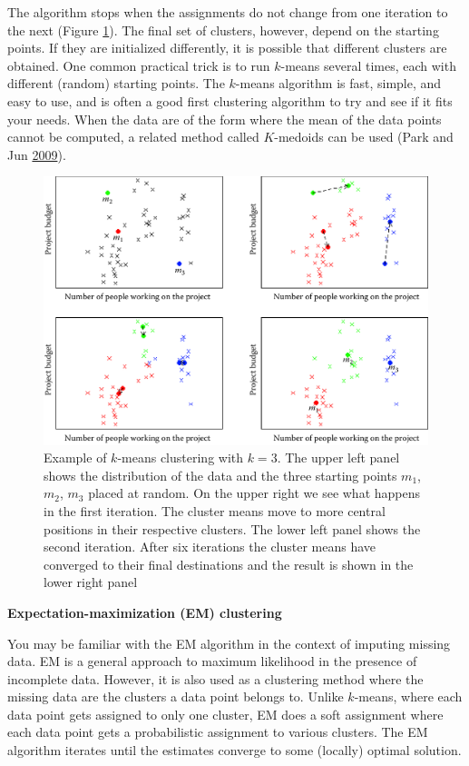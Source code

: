 \documentclass[]{krantz}
\begin{document}
The algorithm stops when the assignments do not change from one
iteration to the next (Figure \ref{fig:kmeans}). The final set of
clusters, however, depend on the starting points. If they are
initialized differently, it is possible that different clusters are
obtained. One common practical trick is to run \(k\)-means several
times, each with different (random) starting points. The \(k\)-means
algorithm is fast, simple, and easy to use, and is often a good first
clustering algorithm to try and see if it fits your needs. When the data
are of the form where the mean of the data points cannot be computed, a
related method called \(K\)-medoids can be used (Park and Jun
\protect\hyperlink{ref-park2009simple}{2009}).

\begin{figure}

{\centering \includegraphics[width=0.7\linewidth]{ChapterML/figures/kmeans} 

}

\caption{Example of $k$-means clustering with $k = 3$. The upper left panel shows the distribution of the data and the three starting points $m_1$, $m_2$, $m_3$ placed at random. On the upper right we see what happens in the first iteration. The cluster means move to more central positions in their respective clusters. The lower left panel shows the second iteration. After six iterations the cluster means have converged to their final destinations and the result is shown in the lower right panel}\label{fig:kmeans}
\end{figure}

\textbf{Expectation-maximization (EM) clustering}

You may be familiar with the EM algorithm in the context of imputing
missing data. EM is a general approach to maximum likelihood in the
presence of incomplete data. However, it is also used as a clustering
method where the missing data are the clusters a data point belongs to.
Unlike \(k\)-means, where each data point gets assigned to only one
cluster, EM does a soft assignment where each data point gets a
probabilistic assignment to various clusters. The EM algorithm iterates
until the estimates converge to some (locally) optimal solution.
\end{document}
